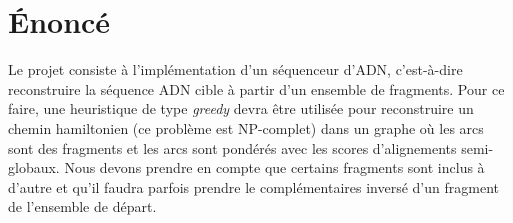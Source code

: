 \section{Énoncé}
Le projet consiste à l'implémentation d'un séquenceur d'ADN,
c'est-à-dire reconstruire la séquence ADN cible à partir d'un ensemble de fragments.
Pour ce faire, une heuristique de type \emph{greedy} devra être utilisée pour
reconstruire un chemin hamiltonien (ce problème est NP-complet) dans un graphe
où les arcs sont des fragments et
les arcs sont pondérés avec les scores d'alignements semi-globaux.
Nous devons prendre en compte que certains fragments sont inclus à d'autre et
qu'il faudra parfois prendre le complémentaires inversé d'un fragment de
l'ensemble de départ.
